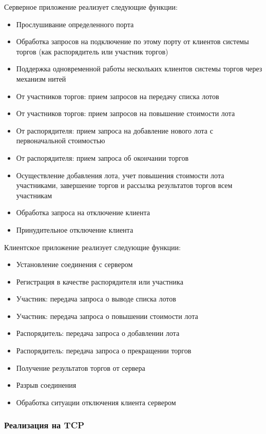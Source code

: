 Серверное приложение реализует следующие функции:
\begin{itemize}
\item Прослушивание определенного порта
\item Обработка запросов на подключение по этому порту от клиентов системы торгов (как распорядитель или участник торгов)
\item Поддержка одновременной работы нескольких клиентов системы
торгов через механизм нитей
\item От участников торгов: прием запросов на передачу списка лотов
\item От участников торгов: прием запросов на повышение стоимости лота
\item От распорядителя: прием запроса на добавление нового лота с первоначальной стоимостью
\item От распорядителя: прием запроса об окончании торгов
\item Осуществление добавления лота, учет повышения стоимости лота участниками, завершение торгов и рассылка результатов торгов всем участникам
\item Обработка запроса на отключение клиента
\item Принудительное отключение клиента
\end{itemize}

Клиентское приложение реализует следующие функции:

\begin{itemize}
\item Установление соединения с сервером
\item Регистрация в качестве распорядителя или участника
\item Участник: передача запроса о выводе списка лотов
\item Участник: передача запроса о повышении стоимости лота
\item Распорядитель: передача запроса о добавлении лота
\item Распорядитель: передача запроса о прекращении торгов
\item Получение результатов торгов от сервера
\item Разрыв соединения
\item Обработка ситуации отключения клиента сервером
\end{itemize}


\subsubsection{Реализация на TCP}

